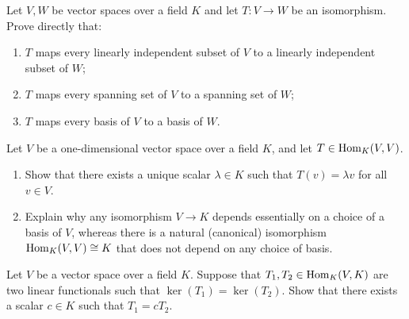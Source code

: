 \begin{exercise}
\label{exc:isomorphisms_preserve_structures}
Let $V, W$ be vector spaces over a field $K$ and let $T \colon V \to W$ be an isomorphism. Prove directly that:
\begin{enumerate}
    \item $T$ maps every linearly independent subset of $V$ to a linearly independent subset of $W$;
    \item $T$ maps every spanning set of $V$ to a spanning set of $W$;
    \item $T$ maps every basis of $V$ to a basis of $W$.
\end{enumerate}
\end{exercise}

\begin{exercise}
\label{exc:one_dim_endomorphism_canonical_iso}
Let $V$ be a one-dimensional vector space over a field $K$, and let $T \in \operatorname{Hom}_K(V, V)$.
\begin{enumerate}
    \item Show that there exists a unique scalar $\lambda \in K$ such that $T(v) = \lambda v$ for all $v \in V$.
    \item Explain why any isomorphism $V \to K$ depends essentially on a choice of a basis of $V$, whereas there is a natural (canonical) isomorphism $\operatorname{Hom}_K(V, V) \cong K$ that does not depend on any choice of basis.
\end{enumerate}
\end{exercise}

\begin{exercise}
\label{exc:functionals_same_kernel_proportional}
Let $V$ be a vector space over a field $K$. Suppose that $T_1, T_2 \in \operatorname{Hom}_K(V, K)$ are two linear functionals such that $\ker(T_1) = \ker(T_2)$. Show that there exists a scalar $c \in K$ such that $T_1 = c T_2$.
\end{exercise}

